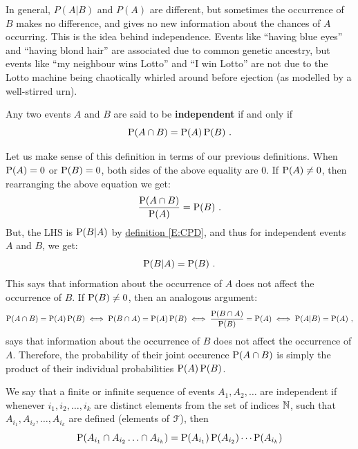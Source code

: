 In general, $P(A | B)$ and $P(A)$ are different, but sometimes the
occurrence of $B$ makes no difference, and gives no new information about the
chances of $A$ occurring.  This is the idea behind independence. Events
like ``having blue eyes'' and ``having blond hair'' are
associated due to common genetic ancestry, but  events like ``my neighbour wins Lotto'' and ``I win Lotto'' are not due to the Lotto machine being chaotically whirled around before ejection (as modelled by a well-stirred urn).

\begin{definition}\label{D:IndOf2Events}
 Any two events $A$ and $B$ are said to be {\bf independent} if and only if
 \begin{equation}\label{E:PofAB=PAPB}
 \P(A \cap B) = \P(A) \P(B) \ .
 \end{equation}
 \end{definition}
 Let us make sense of this definition in terms of our previous definitions.  When $\P(A)=0$ or $\P(B)=0$, both sides of the above equality are $0$.  If $\P(A) \neq 0$, then rearranging the above equation we get:
 \[
 \frac{\P(A \cap B)}{\P(A)} = \P(B) \ .
 \]
 But, the LHS is $\P(B|A)$ by \hyperref[E:CPD]{definition \ref*{E:CPD}}, and thus for independent events $A$ and $B$, we get:
 \[
 \P(B|A) = \P(B) \ .
 \]
This says that information about the occurrence of $A$ does not affect the occurrence of $B$.  If $\P(B) \neq 0$, then an analogous argument:
{\scriptsize
\[
\P(A \cap B) = \P(A) \P(B) \iff \P(B \cap A) = \P(A) \P(B) \iff \frac{\P(B \cap A)}{\P(B)} = \P(A) \iff  \P(A|B) = \P(A) \ ,
\]
}
says that information about the occurrence of $B$ does not affect the occurrence of $A$.  Therefore, the probability of their joint occurence $\P(A \cap B)$ is simply the product of their individual probabilities $\P(A) \P(B)$.

\begin{definition}\label{D:IndOfSeqOfEvents}
We say that a finite or infinite sequence of events $A_1,A_2,\ldots$ are independent if whenever $i_1,i_2,\ldots,i_k$ are distinct elements from the set of indices $\Nz$, such that $A_{i_1},A_{i_2},\ldots,A_{i_k}$ are defined (elements of $\C{F}$), then
\[
\P(A_{i_1} \cap A_{i_2} \ldots \cap A_{i_k})  =  \P(A_{i_1} ) \P(A_{i_2})  \cdots \P(A_{i_k}) 
\]
\end{definition}

